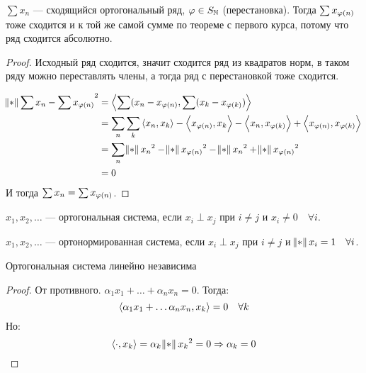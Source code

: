 \begin{consequence}
    $\sum x_n$ --- сходящийся ортогональный ряд, $\varphi \in S_{\mathbb{N}}$ (перестановка).
    Тогда $\sum x_{\varphi(n)}$ тоже сходится и к той же самой сумме по теореме с первого курса, потому что ряд сходится абсолютно.
\end{consequence}
\begin{proof}
    Исходный ряд сходится, значит сходится ряд из квадратов норм, в таком ряду можно переставлять члены, а тогда ряд с перестановкой тоже сходится.

    \begin{align*}
        \norm{\sum x_n - \sum x_{\vp(n)}}^2 & = \dotprod{\sum (x_n - x_{\vp(n)}}{\sum (x_k - x_{\vp(k)})}                                                                                 \\
                                            & = \sum\limits_n \sum\limits_k \dotprod{x_n}{x_k} - \dotprod{x_{\vp(n)}}{x_k} - \dotprod{x_n}{x_{\vp(k)}} + \dotprod{x_{\vp(n)}}{x_{\vp(k)}} \\
                                            & = \sum\limits_n \norm{x_n}^2 - \norm{x_{\vp(n)}}^2 - \norm{x_n}^2 + \norm{x_{\vp(n)}}^2                                                     \\
                                            & = 0
    \end{align*}
    И тогда $\sum x_n = \sum x_{\varphi(n)}$.
\end{proof}

\begin{definition}
    $x_1, x_2, \ldots$ --- ортогональная система, если $x_i \perp x_j$ при $i \neq j$ и $x_i \neq 0 \quad \forall i$.
\end{definition}
\begin{definition}
    $x_1, x_2, \ldots$ --- ортонормированная система, если $x_i \perp x_j$ при $i \neq j$ и $\norm{x_i} = 1\quad \forall i$.
\end{definition}

\begin{observation}
    Ортогональная система линейно независима
\end{observation}
\begin{proof}
    От противного. $\alpha_1 x_1 + \ldots + \alpha_n x_n = 0$. Тогда:
    $$\left\langle \alpha_1 x_1 + \ldots \alpha_n x_n, x_k \right\rangle = 0 \quad \forall k$$
    Но: 
    $$\dotprod{\cdot}{x_k} = \alpha_k \norm{x_k}^2 = 0 \Rightarrow \alpha_k = 0$$
\end{proof}

